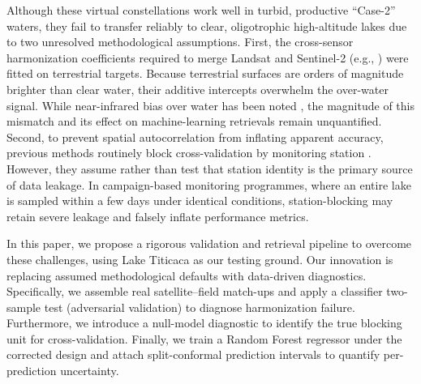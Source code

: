 \documentclass[final,5p,times,twocolumn,authoryear]{elsarticle}
\begin{document}
Although these virtual constellations work well in turbid, productive ``Case-2'' waters, they fail to transfer reliably to clear, oligotrophic high-altitude lakes due to two unresolved methodological assumptions. First, the cross-sensor harmonization coefficients required to merge Landsat and Sentinel-2 (e.g., \citealp{Roy2016}) were fitted on terrestrial targets. Because terrestrial surfaces are orders of magnitude brighter than clear water, their additive intercepts overwhelm the over-water signal. While near-infrared bias over water has been noted \citep{Pahlevan2019}, the magnitude of this mismatch and its effect on machine-learning retrievals remain unquantified. Second, to prevent spatial autocorrelation from inflating apparent accuracy, previous methods routinely block cross-validation by monitoring station \citep{Roberts2017}. However, they assume rather than test that station identity is the primary source of data leakage. In campaign-based monitoring programmes, where an entire lake is sampled within a few days under identical conditions, station-blocking may retain severe leakage and falsely inflate performance metrics. 

In this paper, we propose a rigorous validation and retrieval pipeline to overcome these challenges, using Lake Titicaca as our testing ground. Our innovation is replacing assumed methodological defaults with data-driven diagnostics. Specifically, we assemble \numMatchupsTotal{} real satellite--field match-ups and apply a classifier two-sample test (adversarial validation) \citep{LopezPaz2017} to diagnose harmonization failure. Furthermore, we introduce a null-model diagnostic to identify the true blocking unit for cross-validation. Finally, we train a Random Forest regressor under the corrected design and attach split-conformal prediction intervals \citep{Angelopoulos2023} to quantify per-prediction uncertainty. 
\end{document}

